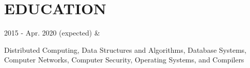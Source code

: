 \documentclass[]{richard-dang}
\begin{document}
\section*{EDUCATION}
\medbreak
\begin{tabularcv}
    2015 - \newline 
    Apr. 2020 (expected)   &   
                    \begin{tabitemize}
                        \item Distributed Computing, Data Structures and Algorithms, Database Systems, Computer Networks, Computer Security, Operating Systems, and Compilers 
                    \end{tabitemize} 

\end{tabularcv}
\end{document}
